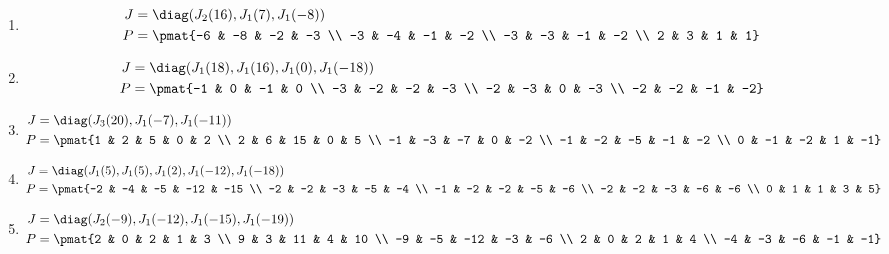 \begin{enumerate}
\item

\begin{align*}
J &= \diag(J_{2}(16), J_{1}(7), J_{1}(-8))\\
P &= \pmat{-6 & -8 & -2 & -3 \\ -3 & -4 & -1 & -2 \\ -3 & -3 & -1 & -2 \\ 2 & 3 & 1 & 1}
\end{align*}

\item

\begin{align*}
J &= \diag(J_{1}(18), J_{1}(16), J_{1}(0), J_{1}(-18))\\
P &= \pmat{-1 & 0 & -1 & 0 \\ -3 & -2 & -2 & -3 \\ -2 & -3 & 0 & -3 \\ -2 & -2 & -1 & -2}
\end{align*}

\item

\begin{align*}
J &= \diag(J_{3}(20), J_{1}(-7), J_{1}(-11))\\
P &= \pmat{1 & 2 & 5 & 0 & 2 \\ 2 & 6 & 15 & 0 & 5 \\ -1 & -3 & -7 & 0 & -2 \\ -1 & -2 & -5 & -1 & -2 \\ 0 & -1 & -2 & 1 & -1}
\end{align*}

\item

\begin{align*}
J &= \diag(J_{1}(5), J_{1}(5), J_{1}(2), J_{1}(-12), J_{1}(-18))\\
P &= \pmat{-2 & -4 & -5 & -12 & -15 \\ -2 & -2 & -3 & -5 & -4 \\ -1 & -2 & -2 & -5 & -6 \\ -2 & -2 & -3 & -6 & -6 \\ 0 & 1 & 1 & 3 & 5}
\end{align*}

\item

\begin{align*}
J &= \diag(J_{2}(-9), J_{1}(-12), J_{1}(-15), J_{1}(-19))\\
P &= \pmat{2 & 0 & 2 & 1 & 3 \\ 9 & 3 & 11 & 4 & 10 \\ -9 & -5 & -12 & -3 & -6 \\ 2 & 0 & 2 & 1 & 4 \\ -4 & -3 & -6 & -1 & -1}
\end{align*}


\end{enumerate}

